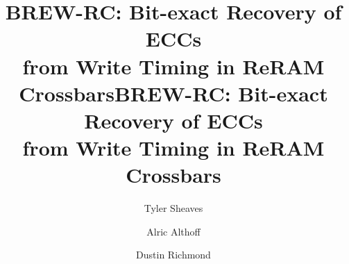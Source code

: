 \documentclass[sigconf]{acmart} %
\begin{document}
\title[BREW-RC: Bit-exact Recovery of ECCs from Write Timing in ReRAM Crossbars]
{BREW-RC: Bit-exact Recovery of ECCs\\from Write Timing in ReRAM Crossbars}
\title[BREW-RC: Bit-exact Recovery of ECCs from Write Timing in ReRAM Crossbars] %
      {\texorpdfstring{BREW-RC: Bit-exact Recovery of ECCs\\from Write Timing in ReRAM Crossbars}{BREW-RC: Bit-exact Recovery of ECCs from Write Timing in ReRAM Crossbars}}

\author{Tyler Sheaves}

\author{Alric Althoff}

\author{Dustin Richmond}


\maketitle
\setlength{\textfloatsep}{5pt}
\setlength{\floatsep}{5pt}
\end{document}
